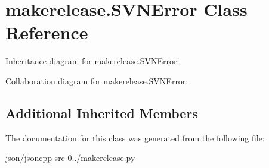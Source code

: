 \hypertarget{classmakerelease_1_1_s_v_n_error}{\section{makerelease.\+S\+V\+N\+Error Class Reference}
\label{classmakerelease_1_1_s_v_n_error}
}


Inheritance diagram for makerelease.\+S\+V\+N\+Error\+:


Collaboration diagram for makerelease.\+S\+V\+N\+Error\+:
\subsection*{Additional Inherited Members}


The documentation for this class was generated from the following file\+:\begin{DoxyCompactItemize}
\item 
json/jsoncpp-\/src-\/0../makerelease.\+py\end{DoxyCompactItemize}

